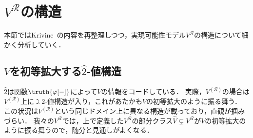 \documentclass[realisability.tex]{subfiles}
\begin{document}
\section{$V^{\mathcal{R}}$の構造}
本節ではKrivine~\cite{Krivine:2014yu}の内容を再整理しつつ，実現可能性モデル$V^{\mathcal{R}}$の構造について細かく分析していく．

\subsection{$V$を初等拡大する$\hat{2}$-値構造}
$\hat{2}$は関数$\truth{ \varphi[-] }$によって$V$の情報をコードしている．
実際，$V^{(\mathcal{R})}$の場合は$V^{(\mathcal{R})}$上に$\gimel 2$-値構造が入り，これがあたかも$V$の初等拡大のように振る舞う．
この状況は$V^{(\mathcal{R})}$という同じドメイン上に異なる構造が載っており，直観が掴みづらい．
我々の$V^{\mathcal{R}}$では，上で定義した$V^{\mathcal{R}}$の部分クラス$\hat{V} \subsetneq V^{\mathcal{R}}$が$V$の初等拡大のように振る舞うので，随分と見通しがよくなる．
\end{document}
